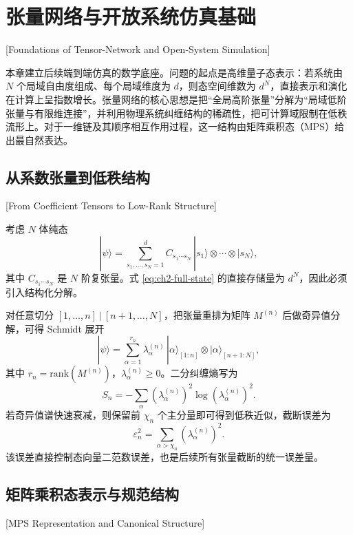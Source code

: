 
\chapter{张量网络与开放系统仿真基础}[Foundations of Tensor-Network and Open-System Simulation]

本章建立后续端到端仿真的数学底座。问题的起点是高维量子态表示：若系统由 $N$ 个局域自由度组成、每个局域维度为 $d$，则态空间维数为 $d^N$，直接表示和演化在计算上呈指数增长。张量网络的核心思想是把“全局高阶张量”分解为“局域低阶张量与有限维连接”，并利用物理系统纠缠结构的稀疏性，把可计算域限制在低秩流形上。对于一维链及其顺序相互作用过程，这一结构由矩阵乘积态（MPS）给出最自然表达。

\section{从系数张量到低秩结构}[From Coefficient Tensors to Low-Rank Structure]

考虑 $N$ 体纯态
\begin{equation}
|\psi\rangle=\sum_{s_1,\ldots,s_N=1}^{d}C_{s_1\cdots s_N}\,|s_1\rangle\otimes\cdots\otimes|s_N\rangle,
\label{eq:ch2-full-state}
\end{equation}
其中 $C_{s_1\cdots s_N}$ 是 $N$ 阶复张量。式 \eqref{eq:ch2-full-state} 的直接存储量为 $d^N$，因此必须引入结构化分解。

对任意切分 $[1,\ldots,n]\ |\ [n+1,\ldots,N]$，把张量重排为矩阵 $M^{(n)}$ 后做奇异值分解，可得 Schmidt 展开
\begin{equation}
|\psi\rangle=\sum_{\alpha=1}^{r_n}\lambda_\alpha^{(n)}\,
|\alpha\rangle_{[1:n]}\otimes|\alpha\rangle_{[n+1:N]},
\label{eq:ch2-schmidt}
\end{equation}
其中 $r_n=\mathrm{rank}(M^{(n)})$，$\lambda_\alpha^{(n)}\ge 0$。二分纠缠熵写为
\begin{equation}
S_n=-\sum_{\alpha}(\lambda_\alpha^{(n)})^2\log (\lambda_\alpha^{(n)})^2.
\end{equation}
若奇异值谱快速衰减，则保留前 $\chi_n$ 个主分量即可得到低秩近似，截断误差为
\begin{equation}
\varepsilon_n^2=\sum_{\alpha>\chi_n}(\lambda_\alpha^{(n)})^2.
\label{eq:ch2-truncerr}
\end{equation}
该误差直接控制态向量二范数误差，也是后续所有张量截断的统一误差量。

\section{矩阵乘积态表示与规范结构}[MPS Representation and Canonical Structure]

